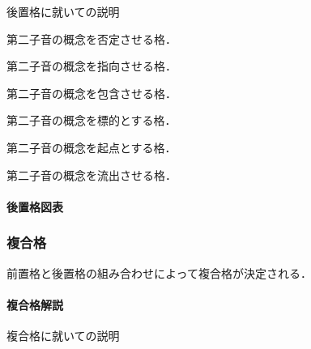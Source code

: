 \documentclass[
  japanese,
]{article}
\providecommand{\tightlist}{%
  \setlength{\itemsep}{0pt}\setlength{\parskip}{0pt}}
\begin{document}
後置格に就いての説明

\begin{description}
\tightlist
\item[否格]
第二子音の概念を否定させる格．
\item[与格]
第二子音の概念を指向させる格．
\item[属格]
第二子音の概念を包含させる格．
\item[対格]
第二子音の概念を標的とする格．
\item[主格]
第二子音の概念を起点とする格．
\item[流格]
第二子音の概念を流出させる格．
\end{description}

\paragraph{後置格図表}\label{subsection5.2.2}

\subsubsection{複合格}\label{section5.3}

前置格と後置格の組み合わせによって複合格が決定される．

\paragraph{複合格解説}\label{subsection5.3.1}

複合格に就いての説明
\end{document}
